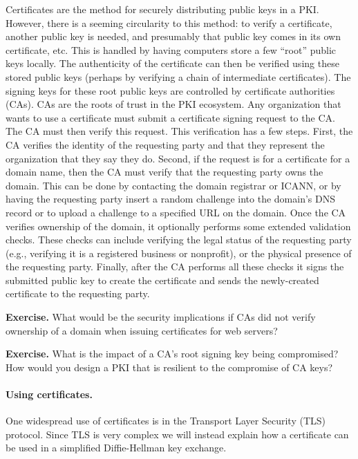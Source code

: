 Certificates are the method for securely distributing public keys in a PKI. However,
there is a seeming circularity to this method: to verify a certificate, another public key is needed,
and presumably that public key comes in its own certificate, etc. This is handled
by having computers store a few ``root'' public keys locally. The authenticity
of the certificate can then be verified using these stored public keys
(perhaps by verifying a chain of intermediate certificates). The
signing keys for these root public keys are controlled by certificate
authorities (CAs). CAs are the roots of trust in the PKI
ecosystem. Any organization that wants to use a certificate must
submit a certificate signing request to the CA.  The CA must then verify
this request. This verification has a few steps. First, the CA verifies
the identity of the requesting party and that they represent the organization
that they say they do. Second, if the request is for a certificate for a domain
name, then the CA must verify that the requesting party owns the domain. This can be
done by contacting the domain registrar or ICANN, or by having the requesting
party insert a random challenge into the domain's DNS record or to upload a challenge to a specified URL on the domain. Once the CA verifies
ownership of the domain, it optionally performs some extended validation checks.
These checks can include verifying the legal status of the requesting party
(e.g., verifying it is a registered business or nonprofit), or the physical
presence of the requesting party. Finally, after the CA performs all these checks
it signs the submitted public key to create the certificate and sends the newly-created
certificate to the requesting party.

\noindent\textbf{Exercise.} What would be the security implications if
CAs did not verify ownership of a domain when issuing certificates for web servers?

\noindent\textbf{Exercise.} What is the impact of a CA's root signing key being
compromised? How would you design a PKI that is resilient to the compromise
of CA keys?

\paragraph{Using certificates.} One widespread use of certificates is
in the Transport Layer Security (TLS) protocol. Since TLS is very complex
we will instead explain how a certificate can be used in a simplified Diffie-Hellman
key exchange.

